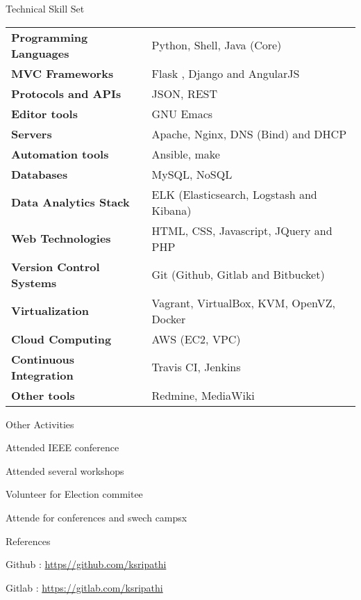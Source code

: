 \documentclass{resume} %
\begin{document}

\begin{rSection}
  {Technical Skill Set}

  \begin{tabular}{ @{} >{\bfseries}l @{\hspace{6ex}} l }
    Programming Languages & Python, Shell, Java (Core) \\
    MVC Frameworks & Flask , Django and AngularJS\\
    Protocols and APIs & JSON, REST \\
    Editor tools & GNU Emacs \\
    Servers & Apache, Nginx, DNS (Bind) and DHCP \\  
    Automation tools & Ansible, make \\
    Databases &  MySQL, NoSQL \\
    Data Analytics Stack & ELK (Elasticsearch, Logstash and Kibana) \\
    Web Technologies & HTML, CSS, Javascript, JQuery and PHP \\
    Version Control Systems & Git (Github, Gitlab and Bitbucket) \\
    Virtualization & Vagrant, VirtualBox, KVM, OpenVZ, Docker \\
    Cloud Computing & AWS (EC2, VPC) \\
    Continuous Integration & Travis CI, Jenkins \\
    Other tools & Redmine, MediaWiki
    
  \end{tabular}

\end{rSection}


\begin{rSection}{Other Activities}

\item Attended IEEE conference
\item Attended several workshops
\item Volunteer for Election commitee
\item Attende for conferences and swech campsx
 

\end{rSection}


\begin{rSection}{References}
\item Github : \url{https//github.com/ksripathi}

  \item Gitlab : \url { https://gitlab.com/ksripathi}

\end{rSection}
\end{document}

